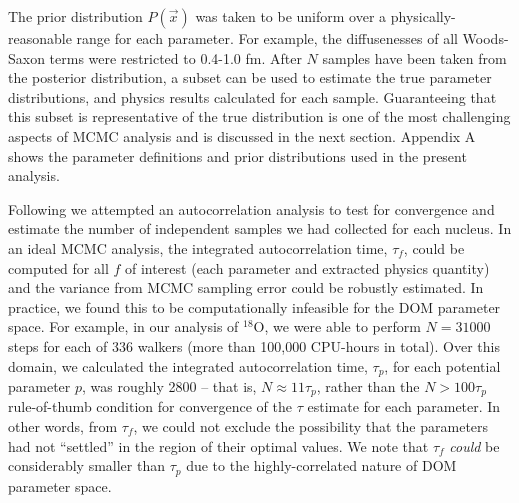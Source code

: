 \documentclass[twocolumn,secnumarabic,amssymb, nobibnotes, aps, prl,
superscriptaddress, nobalancelastpage, draft]{revtex4}
\newcommand{\oEight}{\ensuremath{^{18}}O}
\begin{document}
    The prior distribution $P(\vec{x})$ was taken to be uniform over a
physically-reasonable range for each parameter. For example, the
diffusenesses of all Woods-Saxon terms were restricted to 0.4-1.0 fm.
After $N$ samples have been taken from the posterior distribution,
a subset can be used to estimate the true parameter distributions,
and physics results calculated for each sample. Guaranteeing that this subset is
representative of the true distribution is one of the most challenging aspects
of MCMC analysis and is discussed in the next section. Appendix A
shows the parameter definitions and prior distributions used in the present
analysis.

Following \cite{Foreman-Mackey2013} we attempted an
autocorrelation analysis to test for convergence
and estimate the number of independent samples we had collected for each nucleus.
In an ideal MCMC analysis, the integrated autocorrelation time, $\tau_{f}$,
could be computed for all $f$ of interest (each parameter and extracted physics
quantity) and the variance from MCMC sampling error could be robustly estimated.
In practice, we found this to be computationally infeasible
for the DOM parameter space. For example, in our analysis of \oEight, we were
able to perform $N=31000$ steps for each of 336 walkers (more than 100,000
CPU-hours in total). Over this domain, we calculated the
integrated autocorrelation time, $\tau_{p}$, for each potential parameter $p$,
was roughly 2800 -- that is, $N \approx 11\tau_{p}$, rather than the
$N > 100\tau_{p}$ rule-of-thumb condition for convergence of the $\tau$ estimate
for each parameter. In other words, from $\tau_{f}$, we could not exclude the
possibility that the parameters had not ``settled'' in the region of their
optimal values. We note that $\tau_{f}$ \textit{could} be considerably
smaller than $\tau_{p}$ due to the highly-correlated nature of DOM parameter space.
\end{document}
